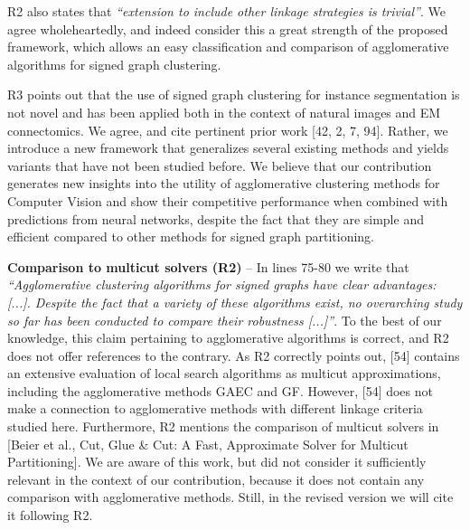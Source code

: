 \documentclass[10pt,twocolumn,letterpaper]{article}
\begin{document}
R2 also states that \emph{``extension to include other linkage strategies is trivial''}. We agree wholeheartedly, and indeed consider this a great strength of the proposed framework, which allows an easy classification and comparison of agglomerative algorithms for signed graph clustering.

R3 points out that the use of signed graph clustering for instance segmentation is not novel and has been applied both in the context of natural images and EM connectomics. We agree, and cite pertinent prior work [42, 2, 7, 94]. Rather, we introduce a new framework that generalizes several existing methods and yields variants that have not been studied before. We believe that our contribution generates new insights into the utility of agglomerative clustering methods for Computer Vision and show their competitive performance when combined with predictions from neural networks, despite the fact that they are simple and efficient compared to other methods for signed graph partitioning. 


\textbf{Comparison to multicut solvers (R2)} -- 
In lines 75-80 we write that \emph{``Agglomerative clustering algorithms for signed graphs have clear advantages: [...]. Despite the fact that a variety of these algorithms exist, no overarching study so far has been conducted to compare their robustness [...]''}. 
To the best of our knowledge, this claim pertaining to agglomerative algorithms is correct, and R2 does not offer references to the contrary.
As R2 correctly points out, [54] contains an extensive evaluation of local search algorithms as multicut approximations, including the agglomerative methods GAEC and GF. However, [54] does not make a connection to agglomerative methods with different linkage criteria studied here. 
Furthermore, R2 mentions the comparison of multicut solvers in [Beier et al., Cut, Glue \& Cut: A Fast, Approximate Solver for Multicut Partitioning]. We are aware of this work, but did not consider it sufficiently relevant in the context of our contribution, because it does not contain any comparison with agglomerative methods. Still, in the revised version we will cite it following R2.
\end{document}

